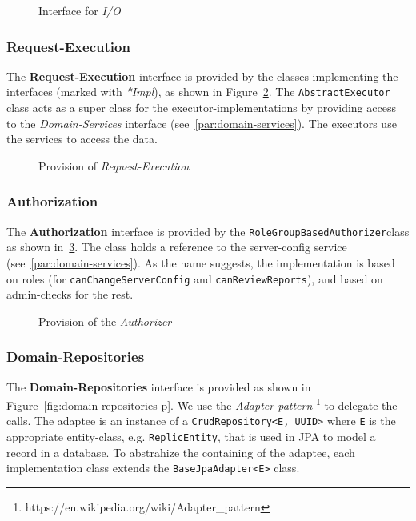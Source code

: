 \begin{figure}
    \centering

    \caption{Interface for \textit{I/O}}
    \label{fig:domain-io}
\end{figure}

\subsubsection{Request-Execution}
The \textbf{Request-Execution} interface is provided by the classes implementing the interfaces (marked with \textit{*Impl}), as shown in Figure~\ref{fig:inter-executors-d}.
The \texttt{AbstractExecutor} class acts as a super class for the executor-implementations by providing access to the \textit{Domain-Services} interface (see~\ref{par:domain-services}).
The executors use the services to access the data.

\begin{figure}
    \centering

    \caption{Provision of \textit{Request-Execution}}
    \label{fig:inter-executors-d}
\end{figure}

\subsubsection{Authorization}
The \textbf{Authorization} interface is provided by the \texttt{RoleGroupBasedAuthorizer}class as shown in~\ref{fig:inter-authorizer-p}.
The class holds a reference to the server-config service (see~\ref{par:domain-services}). \newline
As the name suggests, the implementation is based on roles (for \texttt{canChangeServerConfig} and \texttt{canReviewReports}), and based on admin-checks for the rest.

\begin{figure}
    \centering

    \caption{Provision of the \textit{Authorizer}}
    \label{fig:inter-authorizer-p}
\end{figure}

\subsubsection{Domain-Repositories}
The \textbf{Domain-Repositories} interface is provided as shown in Figure~\ref{fig:domain-repositories-p}.
We use the \textit{Adapter pattern} \footnote{https://en.wikipedia.org/wiki/Adapter_pattern} to delegate the calls. \newline
The adaptee is an instance of a \texttt{CrudRepository<E, UUID>} where \texttt{E} is the appropriate entity-class, e.g. \texttt{ReplicEntity}, that is used in JPA to model a record in a database.
To abstrahize the containing of the adaptee, each implementation class extends the \texttt{BaseJpaAdapter<E>} class.

